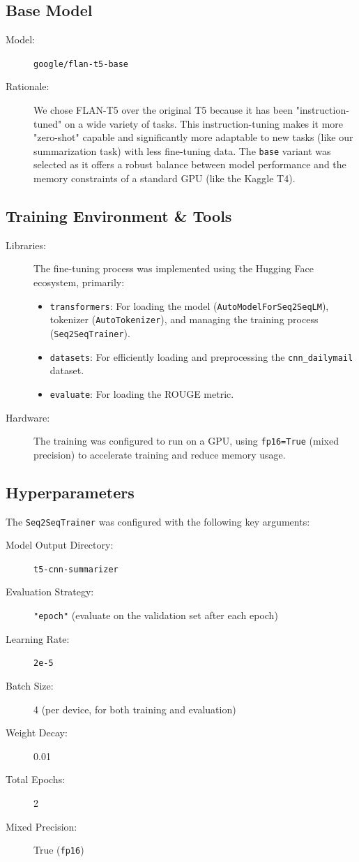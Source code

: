 \documentclass[12pt,a4paper]{article}
\begin{document}
\subsection{Base Model}
\begin{description}
    \item[Model:] \texttt{google/flan-t5-base}
    \item[Rationale:] We chose FLAN-T5 over the original T5 because it has been "instruction-tuned" on a wide variety of tasks. This instruction-tuning makes it more "zero-shot" capable and significantly more adaptable to new tasks (like our summarization task) with less fine-tuning data. The \texttt{base} variant was selected as it offers a robust balance between model performance and the memory constraints of a standard GPU (like the Kaggle T4).
\end{description}

\subsection{Training Environment \& Tools}
\begin{description}
    \item[Libraries:] The fine-tuning process was implemented using the Hugging Face ecosystem, primarily:
        \begin{itemize}
            \item \texttt{transformers}: For loading the model (\texttt{AutoModelForSeq2SeqLM}), tokenizer (\texttt{AutoTokenizer}), and managing the training process (\texttt{Seq2SeqTrainer}).
            \item \texttt{datasets}: For efficiently loading and preprocessing the \texttt{cnn\_dailymail} dataset.
            \item \texttt{evaluate}: For loading the ROUGE metric.
        \end{itemize}
    \item[Hardware:] The training was configured to run on a GPU, using \texttt{fp16=True} (mixed precision) to accelerate training and reduce memory usage.
\end{description}

\subsection{Hyperparameters}
The \texttt{Seq2SeqTrainer} was configured with the following key arguments:

\begin{description}
    \item[Model Output Directory:] \texttt{t5-cnn-summarizer}
    \item[Evaluation Strategy:] \texttt{"epoch"} (evaluate on the validation set after each epoch)
    \item[Learning Rate:] \texttt{2e-5}
    \item[Batch Size:] 4 (per device, for both training and evaluation)
    \item[Weight Decay:] 0.01
    \item[Total Epochs:] 2
    \item[Mixed Precision:] True (\texttt{fp16})
\end{description}
\end{document}
